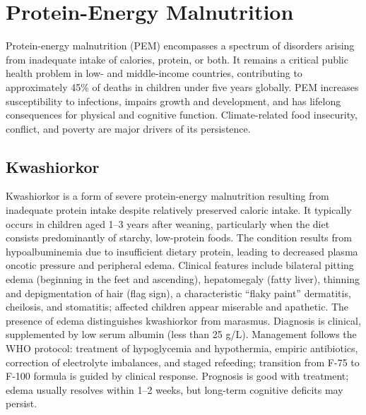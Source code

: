 \section{Protein-Energy Malnutrition}








\label{sec:Protein-Energy Malnutrition}

Protein-energy malnutrition (PEM) encompasses a spectrum of disorders arising from inadequate intake of calories, protein, or both. It remains a critical public health problem in low- and middle-income countries, contributing to approximately 45\% of deaths in children under five years globally. PEM increases susceptibility to infections, impairs growth and development, and has lifelong consequences for physical and cognitive function. Climate-related food insecurity, conflict, and poverty are major drivers of its persistence.

\subsection{Kwashiorkor}
\label{sec:Kwashiorkor}
Kwashiorkor is a form of severe protein-energy malnutrition resulting from inadequate protein intake despite relatively preserved caloric intake. It typically occurs in children aged 1--3 years after weaning, particularly when the diet consists predominantly of starchy, low-protein foods. The condition results from hypoalbuminemia due to insufficient dietary protein, leading to decreased plasma oncotic pressure and peripheral edema. Clinical features include bilateral pitting edema (beginning in the feet and ascending), hepatomegaly (fatty liver), thinning and depigmentation of hair (flag sign), a characteristic ``flaky paint'' dermatitis, cheilosis, and stomatitis; affected children appear miserable and apathetic. The presence of edema distinguishes kwashiorkor from marasmus. Diagnosis is clinical, supplemented by low serum albumin (less than 25 g/L). Management follows the WHO protocol: treatment of hypoglycemia and hypothermia, empiric antibiotics, correction of electrolyte imbalances, and staged refeeding; transition from F-75 to F-100 formula is guided by clinical response. Prognosis is good with treatment; edema usually resolves within 1--2 weeks, but long-term cognitive deficits may persist.

